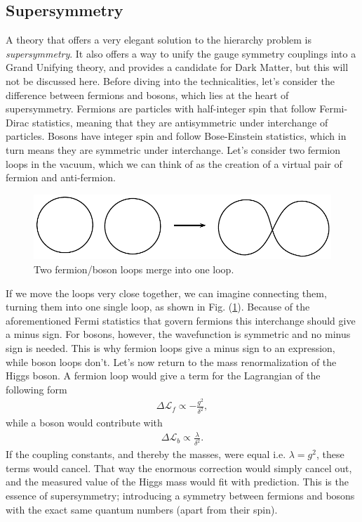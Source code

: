 \documentclass[11pt]{article}
\begin{document}
\subsection*{Supersymmetry}
\begin{flushleft}
A theory that offers a very elegant solution to the hierarchy problem is \textit{supersymmetry}. It also offers a way to unify the gauge symmetry couplings into a Grand Unifying theory, and provides a candidate for Dark Matter, but this will not be discussed here. Before diving into the technicalities, let's consider the difference between fermions and bosons, which lies at the heart of supersymmetry. Fermions are particles with half-integer spin that follow Fermi-Dirac statistics, meaning that they are antisymmetric under interchange of particles. Bosons have integer spin and follow Bose-Einstein statistics, which in turn means they are symmetric under interchange. Let's consider two fermion loops in the vacuum, which we can think of as the creation of a virtual pair of fermion and anti-fermion.

\begin{figure}[H]
\centering
\includegraphics[scale=0.8]{fermion_loop.pdf}
\caption{Two fermion/boson loops merge into one loop.}
\label{fig:: fermion loop}
\end{figure}

If we move the loops very close together, we can imagine connecting them, turning them into one single loop, as shown in Fig. (\ref{fig:: fermion loop}). Because of the aforementioned Fermi statistics that govern fermions this interchange should give a minus sign. For bosons, however, the wavefunction is symmetric and no minus sign is needed. This is why fermion loops give a minus sign to an expression, while boson loops don't. Let's now return to the mass renormalization of the Higgs boson. A fermion loop would give a term for the Lagrangian of the following  form  
\begin{align}
\Delta \mathcal{L}_f \propto - \frac{g^2}{\delta^2},
\end{align}
while a boson would contribute with
\begin{align}
\Delta \mathcal{L}_b \propto \frac{\lambda}{\delta^2}.
\end{align}
If the coupling constants, and thereby the masses, were equal i.e. $\lambda = g^2$, these terms would cancel. That way the enormous correction would simply cancel out, and the measured value of the Higgs mass would fit with prediction. This is the essence of supersymmetry; introducing a symmetry between fermions and bosons with the exact same quantum numbers (apart from their spin).
\end{flushleft}
\end{document}
